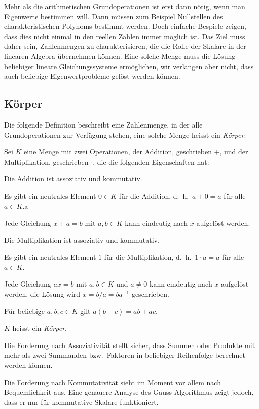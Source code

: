 Mehr als die arithmetischen Grundoperationen ist erst dann nötig, 
wenn man Eigenwerte bestimmen will. 
Dann müssen zum Beispiel Nullstellen des charakteristischen Polynoms
bestimmt werden.
Doch einfache Bespiele zeigen, dass dies nicht einmal in den reellen
Zahlen immer möglich ist.
Das Ziel muss daher sein, Zahlenmengen zu charakterisieren, die die
Rolle der Skalare in der linearen Algebra übernehmen können.
Eine solche Menge muss die Lösung beliebiger lineare Gleichungssysteme
ermöglichen, wir verlangen aber nicht, dass auch beliebige Eigenwertprobleme
gelöst werden können.

\subsection{Körper}
Die folgende Definition beschreibt eine Zahlenmenge, in der alle
Grundoperationen zur Verfügung stehen, eine solche Menge heisst
ein {\em Körper}.
%

\begin{definition}
Sei $K$ eine Menge mit zwei Operationen, der Addition, geschrieben $+$,
und der Multiplikation, geschrieben $\cdot$, die die folgenden
Eigenschaften hat:
\begin{compactenum}
\item Die Addition ist assoziativ und kommutativ.
\item Es gibt ein neutrales Element $0\in K$ für die Addition,
d.~h.~$a+0=a$ für alle $a\in K$.a
\item Jede Gleichung $x+a=b$ mit $a,b\in K$ kann eindeutig nach $x$ aufgelöst
werden.
\item Die Multiplikation ist assoziativ und kommutativ.
\item Es gibt ein neutrales Element $1$ für die Multiplikation,
d.~h.~$1\cdot a=a$ für alle $a\in K$.
\item Jede Gleichung $ax=b$ mit $a,b\in K$ und $a\ne 0$ kann eindeutig 
nach $x$ aufgelöst werden, die Lösung wird $x=b/a=ba^{-1}$ geschrieben.
\item Für beliebige $a,b,c\in K$ gilt
$a(b+c)=ab+ac$.
\end{compactenum}
$K$ heisst ein {\em Körper}.
\end{definition}

Die Forderung nach Assoziativität stellt sicher, dass Summen oder
Produkte mit mehr als zwei Summanden bzw.~Faktoren in beliebiger
Reihenfolge berechnet werden können.

Die Forderung nach Kommutativität sieht im Moment vor allem nach
Bequemlichkeit aus.
Eine genauere Analyse des Gauss-Algorithmus zeigt jedoch, dass er 
nur für kommutative Skalare funktioniert.

